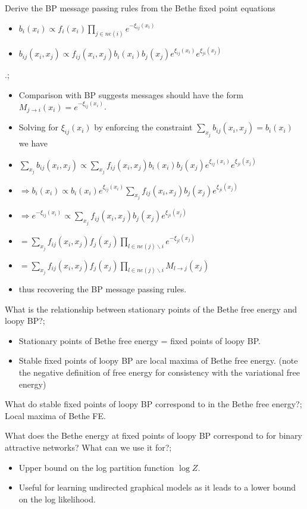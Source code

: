 \documentclass{article}
\begin{document}
Derive the BP message passing rules from the Bethe fixed point equations \begin{itemize} \item $b_i(x_i) \propto f_i(x_i)\prod_{j\in ne(i)} e^{-\xi_{ij}(x_i)}$ \item $b_{ij}(x_i, x_j) \propto f_{ij}(x_i, x_j)b_i(x_i)b_j(x_j)e^{\xi_{ij}(x_i)}e^{\xi_{ji}(x_j)}$ \end{itemize}.; \begin{itemize} \item Comparison with BP suggests messages should have the form $M_{j\rightarrow i}(x_i) = e^{-\xi_{ij}(x_i)}$. \item Solving for $\xi_{ij}(x_i)$ by enforcing the constraint $\sum_{x_j} b_{ij}(x_i, x_j) = b_i(x_i)$ we have \item $\sum_{x_j} b_{ij}(x_i, x_j) \propto \sum_{x_j} f_{ij}(x_i, x_j)b_i(x_i)b_j(x_j)e^{\xi_{ij}(x_i)}e^{\xi_{ji}(x_j)}$ \item $\Rightarrow b_i(x_i) \propto b_i(x_i)e^{\xi_{ij}(x_i)}\sum_{x_j} f_{ij}(x_i, x_j)b_j(x_j)e^{\xi_{ji}(x_j)}$ \item $\Rightarrow e^{-\xi_{ij}(x_i)} \propto \sum_{x_j} f_{ij}(x_i, x_j)b_j(x_j)e^{\xi_{ji}(x_j)}$ \item $=\sum_{x_j} f_{ij}(x_i, x_j)f_j(x_j)\prod_{l\in ne(j)\backslash i}e^{-\xi_{jl}(x_j)}$ \item $=\sum_{x_j} f_{ij}(x_i, x_j)f_j(x_j)\prod_{l\in ne(j)\backslash i}M_{l\rightarrow j}(x_j)$ \item thus recovering the BP message passing rules. \end{itemize}

What is the relationship between stationary points of the Bethe free energy and loopy BP?; \begin{itemize} \item Stationary points of Bethe free energy = fixed points of loopy BP. \item Stable fixed points of loopy BP are local maxima of Bethe free energy. (note the negative definition of free energy for consistency with the variational free energy) \end{itemize}

What do stable fixed points of loopy BP correspond to in the Bethe free energy?; Local maxima of Bethe FE.

What does the Bethe energy at fixed points of loopy BP correspond to for binary attractive networks? What can we use it for?; \begin{itemize} \item Upper bound on the log partition function $\log Z$. \item Useful for learning undirected graphical models as it leads to a lower bound on the log likelihood. \end{itemize}
\end{document}

